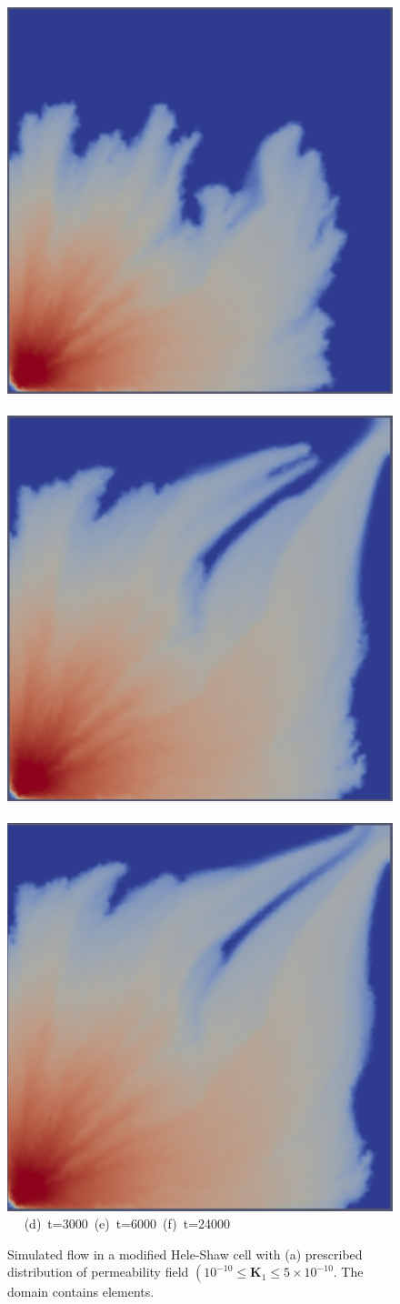 \begin{landscape}
\begin{figure}[ht]
{      \vspace{0.5cm}
      \hbox{\includegraphics[width=.5\textwidth]{./Pics1/Saffman_heterogeneous/saffman_heter_fixed_3000.pdf}
            \includegraphics[width=.5\textwidth]{./Pics1/Saffman_heterogeneous/saffman_heter_fixed_6000.pdf}
            \includegraphics[width=.5\textwidth]{./Pics1/Saffman_heterogeneous/saffman_heter_fixed_24000.pdf} }
      \hbox{\hspace{1.0cm} (d) t=3000 \hspace{5.cm} (e) t=6000 \hspace{3.0cm} (f) t=24000}}
\caption{Simulated flow in a modified Hele-Shaw cell with (a) prescribed distribution of permeability field $\left(\text{10}^{-10}\le\mathbf{K}_{1}\le\text{5}\times\text{10}^{-10}\right.$. The domain contains  elements.}
\label{HeleShawHeter_VR10}
\end{figure}
\end{landscape}
\clearpage



